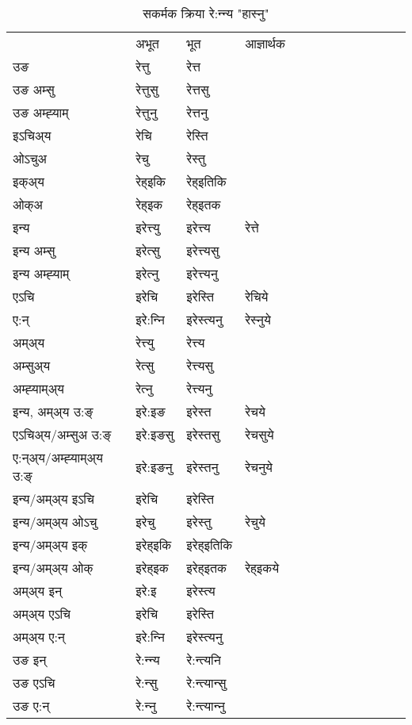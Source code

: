 \begin{table}[H]
\centering
\caption{\label{ett.vt} सकर्मक क्रिया  रे:न्‍न्य  "हास्नु"  }
\begin{tabular}{l|l|l|l|l|l|l|l|l|l|l|l|l}  \toprule
&अभूत & भूत & आज्ञार्थक \\ 
उङ &रेत्तु &रेत्त \\ 
उङ अम्सु&रेत्तुसु &रेत्तसु \\ 
उङ अम्ह्‍याम्&रेत्तुनु &रेत्तनु \\ 
इऽचिअ्य &रेचि &रेस्ति   \\ 
ओऽचुअ        &रेचु &रेस्तु   \\ 
इक्अ्य&रेह्इकि &रेह्इतिकि   \\ 
ओक्अ &रेह्इक &रेह्इतक   \\ 
इन्य & इरेत्त्यु  & इरेत्त्य &रेत्ते  \\ 
इन्य अम्सु& इरेत्सु  & इरेत्त्यसु   \\ 
इन्य अम्ह्‍याम्& इरेत्‍नु  & इरेत्त्यनु   \\ 
एऽचि & इरेचि & इरेस्ति &रेचिये    \\ 
ए:न् & इरे:न्‍नि  & इरेस्त्यनु &रेस्‍नुये  \\ 
अम्अ्य & रेत्त्यु  & रेत्त्य  \\ 
अम्सुअ्य & रेत्सु & रेत्त्यसु  \\ 
अम्ह्‍याम्अ्य & रेत्‍नु  & रेत्त्यनु \\ 
\midrule
इन्य, अम्अ्य उ:ङ्‌ &इरे:इङ &इरेस्त &रेचये \\ 
एऽचिअ्य/अम्सुअ उ:ङ्‌ &इरे:इङसु &इरेस्तसु &रेचसुये \\ 
ए:न्अ्य/अम्ह्‍याम्अ्य उ:ङ्‌ &इरे:इङनु &इरेस्तनु &रेचनुये \\ 
इन्य/अम्अ्य इऽचि &इरेचि &इरेस्ति    \\ 
इन्य/अम्अ्य ओऽचु &इरेचु &इरेस्तु  &रेचुये  \\ 
इन्य/अम्अ्य इक् &इरेह्इकि &इरेह्इतिकि   \\ 
इन्य/अम्अ्य ओक् &इरेह्इक &इरेह्इतक  &रेह्इकये  \\ 
अम्अ्य इन् & इरे:इ & इरेस्त्य   \\ 
अम्अ्य एऽचि & इरेचि & इरेस्ति    \\ 
अम्अ्य ए:न् & इरे:न्‍नि  & इरेस्त्यनु  \\ 
\midrule
उङ इन् & रे:न्‍न्य  & रे:न्त्यनि  \\ 
उङ एऽचि & रे:न्सु  & रे:न्त्यान्सु   \\ 
उङ ए:न्& रे:न्‍नु  & रे:न्त्यान्‍नु   \\ 
\bottomrule
\end{tabular}
\end{table}


